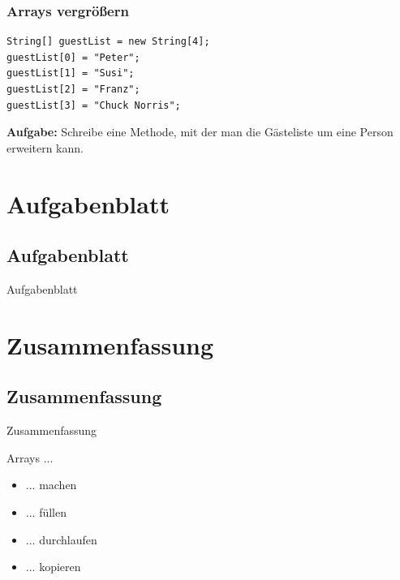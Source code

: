 \documentclass[18pt]{beamer}
\begin{document}

\begin{frame}[containsverbatim]
	\frametitle{Arrays vergrößern}
		
		\begin{lstlisting}
String[] guestList = new String[4];
guestList[0] = "Peter";
guestList[1] = "Susi";
guestList[2] = "Franz";
guestList[3] = "Chuck Norris";
		\end{lstlisting}
		
		\textbf{Aufgabe:} Schreibe eine Methode, mit der man die Gästeliste um eine Person erweitern kann.
\end{frame}


\section{Aufgabenblatt}
\subsection{Aufgabenblatt}
\begin{frame}{Aufgabenblatt}
	
\end{frame}


\section{Zusammenfassung}
\subsection{Zusammenfassung}
\begin{frame}{Zusammenfassung}

	Arrays ...
	\begin{itemize}
		\item ... machen
		\item ... füllen
		\item ... durchlaufen
		\item ... kopieren
	\end{itemize}
\end{frame}%
\end{document}
